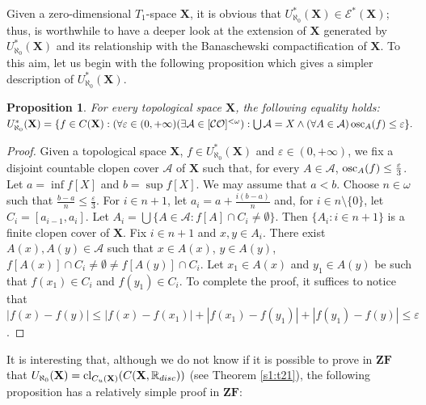\documentclass[12pt,twoside,leqno]{article}
\theoremstyle{plain}
\newtheorem{proposition}[theorem]{Proposition}
\theoremstyle{definition}
\theoremstyle{remark}
\DeclareMathOperator{\cl}{{\rm cl}}
\DeclareMathOperator{\osc}{{\rm osc}}
\begin{document}
Given a zero-dimensional $T_1$-space $\mathbf{X}$, it is obvious that $U_{\aleph_0}^{\ast}(\mathbf{X})\in\mathcal{E}^{\ast}(\mathbf{X})$; thus, is worthwhile to have a deeper look at the extension of $\mathbf{X}$ generated by $U_{\aleph_0}^{\ast}(\mathbf{X})$ and its relationship with the Banaschewski compactification of $\mathbf{X}$. To this aim, let us begin with the following proposition which gives a simpler description of $U_{\aleph_0}^{\ast}(\mathbf{X})$.

\begin{proposition}
	\label{s2:p11}
	For every topological space $\mathbf{X}$, the following equality holds:
	$U_{\aleph_0}^{\ast}(\mathbf{X})=\{ f\in C(\mathbf{X}): (\forall \varepsilon\in (0, +\infty)(\exists \mathcal{A}\in [\mathcal{CO}]^{<\omega}): \bigcup\mathcal{A}=X\wedge(\forall A\in\mathcal{A}) \osc_A(f)\leq\varepsilon\}.$
\end{proposition}
\begin{proof} Given a topological space $\mathbf{X}$,  $f\in U_{\aleph_0}^{\ast}(\mathbf{X})$ and $\varepsilon\in (0, +\infty)$, 
	we fix a disjoint countable clopen cover $\mathcal{A}$ of $\mathbf{X}$ such that, for every $A\in\mathcal{A}$, $\osc_A(f)\leq\frac{\varepsilon}{3}$. Let $a=\inf f[X]$ and $b=\sup  f[X]$. We may assume that $a<b$. Choose $n\in\omega$ such that $\frac{b-a}{n}\leq\frac{\varepsilon}{3}$. For $i\in n+1$,  let $a_i= a+\frac{i(b-a)}{n}$ and, for $i\in n\setminus\{0\}$, let  $C_i=[a_{i-1}, a_{i}]$. Let $A_i=\bigcup\{A\in\mathcal{A}: f[A]\cap C_i\neq\emptyset\}$.  Then $\{A_i: i\in n+1\}$ is a finite clopen cover of $\mathbf{X}$. Fix $i\in n+1$ and $x,y\in A_i$. There exist $A(x), A(y)\in\mathcal{A}$ such that $x\in A(x)$, $y\in A(y)$, $f[A(x)]\cap C_i\neq\emptyset\neq f[A(y)]\cap C_i$. Let $x_1\in A(x)$ and $y_1\in A(y)$ be such that $f(x_1)\in C_i$ and $f(y_1)\in C_i$. To complete the proof, it suffices to notice that  $|f(x)-f(y)|\leq |f(x)-f(x_1)|+|f(x_1)-f(y_1)|+|f(y_1)-f(y)|\leq\varepsilon$.  
\end{proof}

It is interesting that, although we do not know if it is possible to prove in $\mathbf{ZF}$ that $U_{\aleph_0}(\mathbf{X})=\cl_{C_{u}(\mathbf{X})}(C(\mathbf{X}, \mathbb{R}_{disc}))$ (see Theorem \ref{s1:t21}), the following proposition has a relatively simple proof in $\mathbf{ZF}$:
\end{document}
